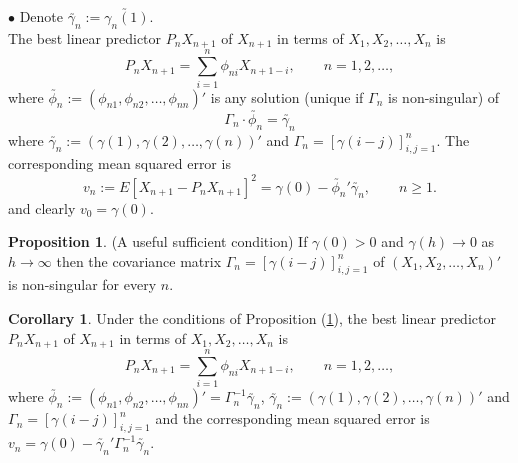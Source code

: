 \documentclass[11pt, a4paper]{article}
\numberwithin{equation}{section}
\theoremstyle{definition}
\newtheorem{proposition}{Proposition}[section]
\newtheorem{corollary}{Corollary}[section]
\begin{document}
$\bullet$ Denote $\utilde{\gamma_n} := \utilde{\gamma_n (1)}$. \\[0.1em]

The best linear predictor $P_nX_{n+1}$ of $X_{n+1}$ in terms of $X_1, X_2, \ldots, X_n$ is
\begin{equation}\label{onesteppredictionequation}
P_nX_{n+1} = \sum \limits_{i = 1}^{n} \phi_{ni} X_{n+1-i}, \qquad n = 1, 2, \ldots,
\end{equation}
where $\utilde{\phi_n} := \left( \phi_{n1}, \phi_{n2}, \ldots, \phi_{nn} \right)'$ is any solution (unique if $\Gamma_n$ is non-singular) of 
\begin{equation}\label{onesteppredictionmatrixequation}
\Gamma_n \cdot \utilde{\phi_n} = \utilde{\gamma_n}
\end{equation} 
where $\utilde{\gamma_n} := \left(\gamma(1), \gamma(2), \ldots, \gamma(n) \right)'$ and $\Gamma_n = \left[ \gamma(i-j) \right]_{i, j = 1}^{n}$. The corresponding mean squared error is 
\begin{equation}\label{onesteppredictionequationMSE}
v_n := E\left[ X_{n+1} - P_n X_{n+1} \right]^2 = \gamma(0) - \utilde{\phi_n}' \utilde{\gamma_n}, \qquad n \geq 1.
\end{equation}
and clearly $v_0 = \gamma(0)$.

\begin{proposition}\label{sufficientconditionforinvertibilityofGamma}
(A useful sufficient condition) If $\gamma(0) > 0$ and $\gamma(h) \rightarrow 0$ as $h \rightarrow \infty$ then the covariance matrix $\Gamma_n = \left[ \gamma(i-j) \right]_{i, j = 1}^{n}$ of $\left( X_1, X_2, \ldots, X_n \right)'$ is non-singular for every $n$.
\end{proposition}

\begin{corollary}
Under the conditions of Proposition (\ref{sufficientconditionforinvertibilityofGamma}), the best linear predictor $P_nX_{n+1}$ of $X_{n+1}$ in terms of $X_1, X_2, \ldots, X_n$ is
$$P_nX_{n+1} = \sum \limits_{i = 1}^{n} \phi_{ni} X_{n+1-i}, \qquad n = 1, 2, \ldots,$$
where $\utilde{\phi_n} := \left( \phi_{n1}, \phi_{n2}, \ldots, \phi_{nn} \right)' = \Gamma_n^{-1} \utilde{\gamma_n}$, $\utilde{\gamma_n} := \left(\gamma(1), \gamma(2), \ldots, \gamma(n) \right)'$ and $\Gamma_n = \left[ \gamma(i-j) \right]_{i, j = 1}^{n}$ and the corresponding mean squared error is $v_n = \gamma(0) - \utilde{\gamma_n}' \Gamma_n^{-1} \utilde{\gamma_n} $.
\end{corollary}
\end{document}

